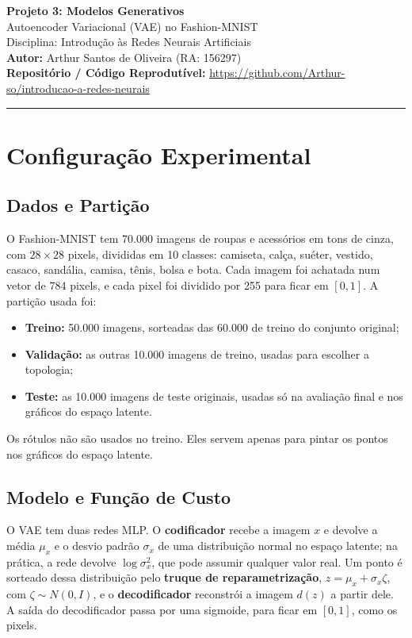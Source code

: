 \documentclass[11pt,a4paper]{article}
\begin{document}
\begin{center}
    {\LARGE \textbf{Projeto 3: Modelos Generativos}} \\[0.3em]
    {\large Autoencoder Variacional (VAE) no Fashion-MNIST} \\[0.3em]
    {\large Disciplina: Introdução às Redes Neurais Artificiais} \\[0.3em]
    \textbf{Autor:} Arthur Santos de Oliveira (RA: 156297) \\[0.2em]
    \textbf{Repositório / Código Reprodutível:} \url{https://github.com/Arthur-so/introducao-a-redes-neurais}
\end{center}
\vspace{-0.5em}
\hrule
\vspace{0.8em}

\section{Configuração Experimental}

\subsection{Dados e Partição}

O Fashion-MNIST tem 70.000 imagens de roupas e acessórios em tons de cinza, com $28\times28$ pixels, divididas em 10 classes: camiseta, calça, suéter, vestido, casaco, sandália, camisa, tênis, bolsa e bota. Cada imagem foi achatada num vetor de 784 pixels, e cada pixel foi dividido por 255 para ficar em $[0, 1]$. A partição usada foi:
\begin{itemize}
    \item \textbf{Treino:} 50.000 imagens, sorteadas das 60.000 de treino do conjunto original;
    \item \textbf{Validação:} as outras 10.000 imagens de treino, usadas para escolher a topologia;
    \item \textbf{Teste:} as 10.000 imagens de teste originais, usadas só na avaliação final e nos gráficos do espaço latente.
\end{itemize}
Os rótulos não são usados no treino. Eles servem apenas para pintar os pontos nos gráficos do espaço latente.

\subsection{Modelo e Função de Custo}

O VAE tem duas redes MLP. O \textbf{codificador} recebe a imagem $x$ e devolve a média $\mu_x$ e o desvio padrão $\sigma_x$ de uma distribuição normal no espaço latente; na prática, a rede devolve $\log \sigma_x^2$, que pode assumir qualquer valor real. Um ponto é sorteado dessa distribuição pelo \textbf{truque de reparametrização}, $z = \mu_x + \sigma_x \zeta$, com $\zeta \sim N(0, I)$, e o \textbf{decodificador} reconstrói a imagem $d(z)$ a partir dele. A saída do decodificador passa por uma sigmoide, para ficar em $[0, 1]$, como os pixels.
\end{document}
